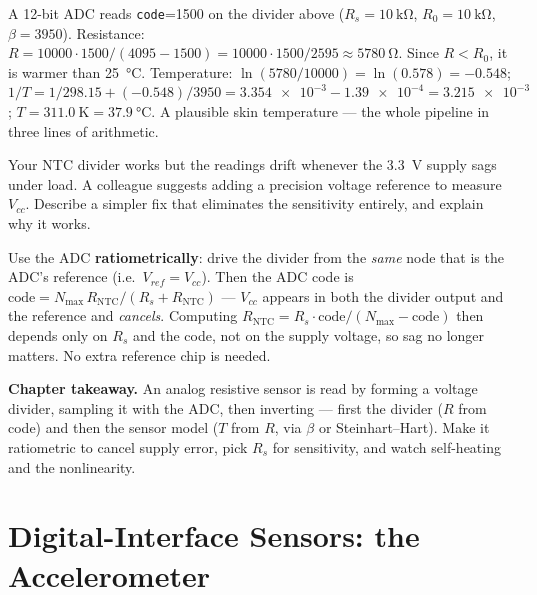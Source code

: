 \documentclass[11pt,a4paper,oneside]{book}
\newcommand{\code}[1]{\texttt{#1}}
\begin{document}
\begin{wexample}
A 12-bit ADC reads \code{code}=\num{1500} on the divider above
($R_s=\qty{10}{\kilo\ohm}$, $R_0=\qty{10}{\kilo\ohm}$, $\beta=3950$).
Resistance: $R = 10000\cdot 1500/(4095-1500)=10000\cdot1500/2595 \approx
\qty{5780}{\ohm}$. Since $R<R_0$, it is warmer than \qty{25}{\celsius}.
Temperature: $\ln(5780/10000)=\ln(0.578)=-0.548$;
$1/T = 1/298.15 + (-0.548)/3950 = \num{3.354e-3} - \num{1.39e-4} =
\num{3.215e-3}$; $T = \qty{311.0}{\kelvin} = \qty{37.9}{\celsius}$. A plausible
skin temperature --- the whole pipeline in three lines of arithmetic.
\end{wexample}

\begin{exercise}
Your NTC divider works but the readings drift whenever the \qty{3.3}{\volt}
supply sags under load. A colleague suggests adding a precision voltage
reference to measure $V_{cc}$. Describe a simpler fix that eliminates the
sensitivity entirely, and explain why it works.
\end{exercise}
\begin{solution}
Use the ADC \textbf{ratiometrically}: drive the divider from the \emph{same}
node that is the ADC's reference (i.e.\ $V_{ref}=V_{cc}$). Then the ADC code is
$\text{code}=N_{\max}\,R_{\text{NTC}}/(R_s+R_{\text{NTC}})$ --- $V_{cc}$ appears
in both the divider output and the reference and \emph{cancels}. Computing
$R_{\text{NTC}}=R_s\cdot\text{code}/(N_{\max}-\text{code})$ then depends only on
$R_s$ and the code, not on the supply voltage, so sag no longer matters. No extra
reference chip is needed.
\end{solution}

\begin{keyidea}
\textbf{Chapter takeaway.} An analog resistive sensor is read by forming a
voltage divider, sampling it with the ADC, then inverting --- first the divider
($R$ from code) and then the sensor model ($T$ from $R$, via $\beta$ or
Steinhart--Hart). Make it ratiometric to cancel supply error, pick $R_s$ for
sensitivity, and watch self-heating and the nonlinearity.
\end{keyidea}

\chapter{Digital-Interface Sensors: the Accelerometer}
\label{ch:accel}
\end{document}
